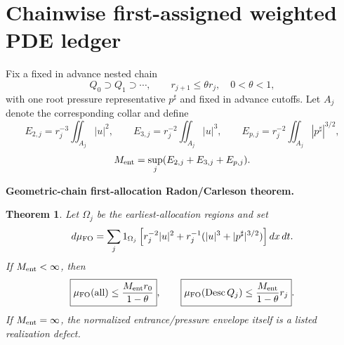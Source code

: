 \documentclass[11pt]{article}
\newtheorem{theorem}{Theorem}[section]
\theoremstyle{definition}\newtheorem{problem}[theorem]{Problem}
\theoremstyle{definition}
\theoremstyle{remark}
\begin{document}
\section{Chainwise first-assigned weighted PDE ledger}
\label{sec:gb18}
Fix a fixed in advance nested chain
\[
Q_0\supset Q_1\supset\cdots,\qquad r_{j+1}\le\theta r_j,\quad0<\theta<1,
\]
with one root pressure representative $p^\sharp$ and fixed in advance cutoffs.  Let
$A_j$ denote the corresponding collar and define
\[
E_{2,j}=r_j^{-3}\iint_{A_j}|u|^2,\qquad
E_{3,j}=r_j^{-2}\iint_{A_j}|u|^3,\qquad
E_{p,j}=r_j^{-2}\iint_{A_j}|p^\sharp|^{3/2},
\]
\[
M_{\rm ent}=\sup_j(E_{2,j}+E_{3,j}+E_{p,j}).
\]

\medskip
\noindent\textbf{Geometric-chain first-allocation Radon/Carleson theorem.}
\begin{theorem}
\label{thm:gb18}
Let $\Omega_j$ be the earliest-allocation regions and set
\[
d\mu_{\rm FO}
=\sum_j1_{\Omega_j}\left[
r_j^{-2}|u|^2+r_j^{-1}(|u|^3+|p^\sharp|^{3/2})
\right]dx\,dt.
\]
If $M_{\rm ent}<\infty$, then
\[
\boxed{\mu_{\rm FO}(\mathrm{all})\le \frac{M_{\rm ent}r_0}{1-\theta}},
\qquad
\boxed{\mu_{\rm FO}(\operatorname{Desc}Q_j)\le \frac{M_{\rm ent}}{1-\theta}r_j}.
\]
If $M_{\rm ent}=\infty$, the normalized entrance/pressure envelope itself is a
listed realization defect.
\end{theorem}
\end{document}
